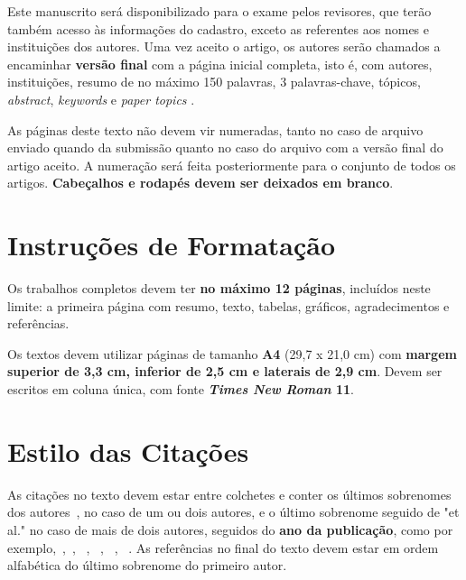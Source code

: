 \documentclass[a4paper,11pt]{article}
\begin{document}
Este manuscrito ser\'a disponibilizado para o exame pelos revisores, que ter\~ao tamb\'em acesso
 \`as informa\c c\~oes do cadastro, exceto as referentes aos nomes e institui\c c\~oes dos autores. 
Uma vez aceito o artigo, os autores ser\~ao chamados a encaminhar \textbf{vers\~ao final} com a p\'agina inicial completa, isto \'e, com autores, institui\c c\~oes, resumo de no m\'aximo 150 palavras, 3 palavras-chave, t\'opicos, \textit{abstract}, \textit{keywords} e \textit{paper topics} .

As p\'aginas deste texto n\~ao devem vir numeradas, tanto no caso de arquivo enviado quando da submiss\~ao quanto no caso do arquivo com a vers\~ao final do artigo aceito. 
A numera\c c\~ao ser\'a feita posteriormente para o conjunto de todos os artigos.
\textbf{Cabe\c calhos e rodap\'es devem ser deixados em branco}.


\section{ Instru\c c\~oes de Formata\c c\~ao}


Os trabalhos completos devem ter \textbf{no m\'aximo 12 p\'aginas}, inclu\'idos neste limite: a primeira p\'agina com resumo, texto, tabelas, gr\'aficos, agradecimentos e refer\^encias.

Os textos devem utilizar p\'aginas de tamanho \textbf{A4} (29,7 x 21,0 cm) com \textbf{margem superior de 3,3 cm, inferior de 2,5 cm e laterais de 2,9 cm}.
 Devem ser escritos em coluna \'unica, com fonte \textbf{\textit{Times New Roman} 11}. 



\section{ Estilo das Cita\c c\~oes}


As cita\c c\~oes no texto devem estar entre colchetes e conter  os \'ultimos sobrenomes dos autores~\citep{silva:99}, no caso de um ou dois autores, e o \'ultimo sobrenome seguido de "et al." no caso de mais de dois autores, seguidos do \textbf{ano da publica\c c\~ao}, como por exemplo,~\citep{anna:06},~\citep{gates:03}, ~\citep{smith:02}, ~\citep{duives:13}, ~\citep{pele:04}, ~\citep{web:16}.
As refer\^encias no final do texto devem estar em ordem alfab\'etica do \'ultimo sobrenome do primeiro autor. 


~\\


\end{document}
